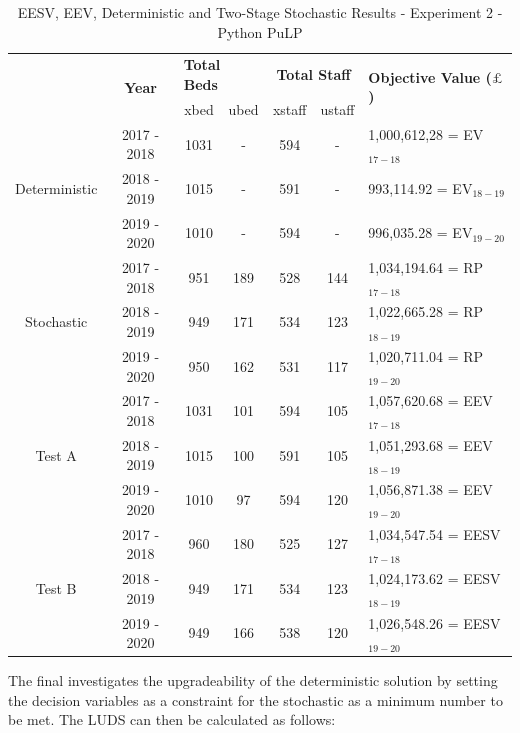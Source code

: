 \documentclass[../thesis.tex]{subfiles}
\begin{document}
\begin{table}[h!]
    \centering
    \begin{tabular}{ccccccl}\toprule
 & \multirow{2}{*}{\textbf{Year}}& \multicolumn{2}{l}{\textbf{Total Beds}} & \multicolumn{2}{c}{\textbf{Total Staff}} & \multirow{2}{*}{\textbf{Objective Value ($\pounds$)}}\\ \cmidrule(lr){3-4} \cmidrule(lr){5-6}
&& xbed           & ubed          & xstaff         & ustaff         \\ \midrule
     \multirow{3}{*}{Deterministic} & 2017 - 2018 & 1031 & - &  594 & - & 1,000,612,28 =  EV$_{17-18}$ \\ 
      & 2018 - 2019 & 1015 & - & 591 & - & 993,114.92 =  EV$_{18-19}$ \\
      & 2019 - 2020 & 1010 & - & 594 & - & 996,035.28 =  EV$_{19-20}$\\\midrule
     \multirow{3}{*}{Stochastic} & 2017 - 2018 & 951 & 189 & 528 & 144 & 1,034,194.64 =  RP$_{17-18}$ \\ 
      & 2018 - 2019 & 949 & 171 & 534 & 123 & 1,022,665.28 =  RP$_{18-19}$ \\
      & 2019 - 2020 & 950 & 162 & 531 & 117 & 1,020,711.04 =  RP$_{19-20}$\\ \midrule
      \multirow{3}{*}{Test A} & 2017 - 2018 &1031 & 101 & 594 & 105 & 1,057,620.68 = EEV$_{17-18}$\\
      & 2018 - 2019 &1015 & 100 & 591 & 105 & 1,051,293.68 = EEV$_{18-19}$\\
      & 2019 - 2020 &1010 & 97 & 594 & 120 & 1,056,871.38 = EEV$_{19-20}$\\\midrule
      \multirow{3}{*}{Test B} & 2017 - 2018 &960 & 180 & 525 & 127 & 1,034,547.54 = EESV$_{17-18}$\\
      & 2018 - 2019 &949 & 171 & 534 & 123 & 1,024,173.62 = EESV$_{18-19}$\\
      & 2019 - 2020 &949 & 166 & 538 & 120 & 1,026,548.26 = EESV$_{19-20}$\\\bottomrule      
    \end{tabular}
    \caption{EESV, EEV, Deterministic and Two-Stage Stochastic Results - Experiment 2 - Python PuLP}
    \label{tab:eesveevdetstocresultspy2}
\end{table}

The final investigates the upgradeability of the deterministic solution by setting the decision variables as a constraint for the stochastic as a minimum number to be met. The LUDS can then be calculated as follows:
\end{document}

